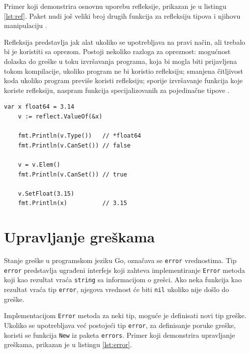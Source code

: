 \documentclass[12pt,oneside]{memoir}
\begin{document}
Primer koji demonstrira osnovnu uporebu refleksije, prikazan je u listingu \ref{lst:ref}. Paket nudi još veliki broj drugih funkcija za refleksiju tipova i njihovu manipulaciju \cite{reflect}.

Refleksija predstavlja jak alat ukoliko se upotrebljava na pravi način, ali trebalo bi je koristiti sa oprezom. Postoji nekoliko razloga za opreznost: mogućnost dolaska do greške u toku izvršavanja programa, koja bi mogla biti prijavljena tokom kompilacije, ukoliko program ne bi koristio refleksiju; smanjena čitljivost koda ukoliko program previše koristi refleksiju; sporije izvršavanje funkcija koje koriste refleksiju, naspram funkcija specijalizovanih za pojedinačne tipove \cite{bookGoProg}.

 \begin{center}
\begin{lstlisting}[caption=Primer koji demonstrira osnovnu upotrebu refleksije, label={lst:ref},  backgroundcolor=\color{background}]
	var x float64 = 3.14
	v := reflect.ValueOf(&x) 
	
	fmt.Println(v.Type())	// *float64
	fmt.Println(v.CanSet())	// false
	
	v = v.Elem()
	fmt.Println(v.CanSet())	// true
	
	v.SetFloat(3.15)
	fmt.Println(x)			// 3.15
\end{lstlisting}
\end{center}

\section{Upravljanje greškama} \label{error}

Stanje greške u programskom jeziku Go, označava se \texttt{error} vrednostima. Tip \texttt{error} predstavlja ugrađeni interfejs koji zahteva implementiranje \texttt{Error} metoda koji kao rezultat vraća \texttt{string} sa informacijom o grešci. Ako neka funkcija kao rezultat vraća tip \texttt{error}, njegova vrednost će biti \texttt{nil} ukoliko nije došlo do greške. 

Implementacijom \texttt{Error} metoda za neki tip, moguće je definisati novi tip greške. Ukoliko se upotrebljava već postojeći tip \texttt{error}, za definisanje poruke greške, koristi se funkcija \texttt{New} iz paketa \texttt{errors}. Primer koji demonstrira upravljanje greškama, prikazan je u listingu \ref{lst:error}.
\end{document}
